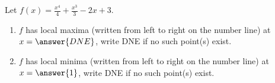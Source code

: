\documentclass{ximera}
\author{Gregory Hartman \and Matthew Carr}
\begin{document}
\begin{exercise}






Let $f(x)=\frac{x^4}{4}+\frac{x^3}{3}-2x+3$.
\begin{enumerate}
\item		$f$ has local maxima (written from left to right on the number line) at $x=\answer{DNE}$, write DNE if no such point(s) exist.
\item		$f$ has local minima (written from left to right on the number line) at $x=\answer{1}$, write DNE if no such point(s) exist.
\end{enumerate}

\end{exercise}
\end{document}
